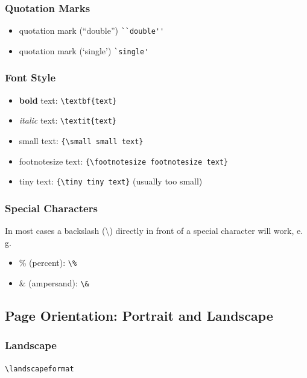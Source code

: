 \documentclass{pharmrep}
\newcommand{\eg}{e.\,g.\xspace}
\begin{document}
\subsubsection{Quotation Marks}
\begin{itemize}
\item quotation mark (``double'') \verb|``double''|
\item quotation mark (`single') \verb|`single'| 
\end{itemize}

\subsubsection{Font Style}
\begin{itemize}
\item \textbf{bold} text: \verb|\textbf{text}|
\item \textit{italic} text: \verb|\textit{text}|
\item {\small small text}: \verb|{\small small text}|
\item {\footnotesize footnotesize text}: \verb|{\footnotesize footnotesize text}|
\item {\tiny tiny text}: \verb|{\tiny tiny text}| (usually too small)
\end{itemize}

\subsubsection{Special Characters}
In most cases a backslash (\textbackslash) directly in front of a special character will work, \eg
\begin{itemize}
\item \% (percent): \verb|\%|
\item \& (ampersand): \verb|\&|
\end{itemize}

\subsection{Page Orientation: Portrait and Landscape}
\blindtext

\landscapeformat
\subsubsection{Landscape}
\verb|\landscapeformat|

\blindtext

\blindtext
\end{document}
